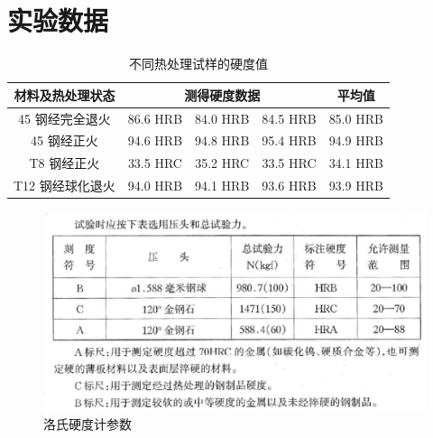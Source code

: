 \documentclass[a4paper,utf8]{article}
\begin{document}
\section{实验数据}
\begin{table}[!ht]\centering
    \caption{不同热处理试样的硬度值}
    \begin{tabular}{|*{5}{c|}}\hline
        材料及热处理状态 & \multicolumn{3}{c|}{测得硬度数据} & 平均值 \bigstrut \\ \hline
        45 钢经完全退火 & 86.6 HRB & 84.0 HRB & 84.5 HRB & 85.0 HRB \bigstrut \\ \hline
        45 钢经正火 & 94.6 HRB & 94.8 HRB & 95.4 HRB & 94.9 HRB \bigstrut \\ \hline
        T8 钢经正火 & 33.5 HRC & 35.2 HRC & 33.5 HRC & 34.1 HRB \bigstrut \\ \hline
        T12 钢经球化退火 & 94.0 HRB & 94.1 HRB & 93.6 HRB & 93.9 HRB \bigstrut \\ \hline
    \end{tabular}
\end{table}
\begin{figure}[!ht]
    \caption{洛氏硬度计参数}
    \includegraphics[width=\textwidth]{fig3.jpg}
\end{figure}\newpage
\end{document}
